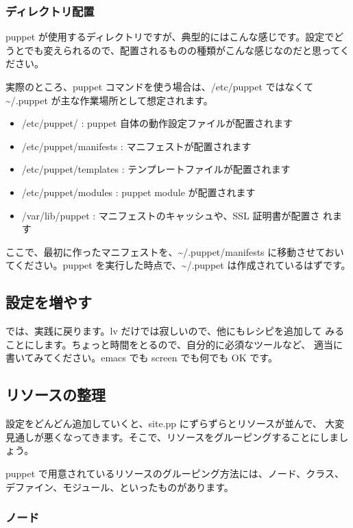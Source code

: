 \documentclass[mingoth,a4paper]{jsarticle}
\begin{document}
\newpage
\subsubsection{ディレクトリ配置}

puppet が使用するディレクトリですが、典型的にはこんな感じです。設定でど
うとでも変えられるので、配置されるものの種類がこんな感じなのだと思ってく
ださい。

実際のところ、puppet コマンドを使う場合は、/etc/puppet ではなくて
\textasciitilde /.puppet が主な作業場所として想定されます。

\begin{itemize}
 \item /etc/puppet/ : puppet 自体の動作設定ファイルが配置されます
 \item /etc/puppet/manifests : マニフェストが配置されます
 \item /etc/puppet/templates : テンプレートファイルが配置されます
 \item /etc/puppet/modules : puppet module が配置されます
 \item /var/lib/puppet : マニフェストのキャッシュや、SSL 証明書が配置さ
       れます
\end{itemize}

ここで、最初に作ったマニフェストを、\textasciitilde /.puppet/manifests に移動させておい
てください。puppet を実行した時点で、\textasciitilde /.puppet は作成されているはずです。


\subsection{設定を増やす}

では、実践に戻ります。lv だけでは寂しいので、他にもレシピを追加して
みることにします。ちょっと時間をとるので、自分的に必須なツールなど、
適当に書いてみてください。emacs でも screen でも何でも OK です。


\subsection{リソースの整理}

設定をどんどん追加していくと、site.pp にずらずらとリソースが並んで、
大変見通しが悪くなってきます。そこで、リソースをグルーピングすることにしましょう。

puppet で用意されているリソースのグルーピング方法には、ノード、クラス、
デファイン、モジュール、といったものがあります。

\subsubsection{ノード}
\end{document}
